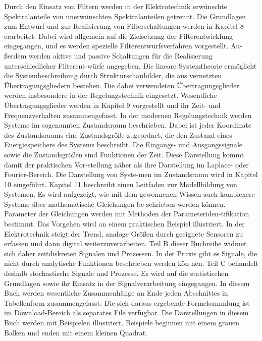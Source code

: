 Durch den Einsatz von Filtern werden in der Elektrotechnik erwünschte Spektralanteile von unerwünschten Spektralanteilen getrennt. Die Grundlagen zum Entwurf und zur Realisierung von Filterschaltungen werden in Kapitel 8 erarbeitet. Dabei wird allgemein auf die Zielsetzung der Filterentwicklung eingegangen, und es werden spezielle Filterentwurfsverfahren vorgestellt. Au-ßerdem werden aktive und passive Schaltungen für die Realisierung unterschiedlicher Filterent-würfe angegeben.\newline
Die lineare Systemtheorie ermöglicht die Systembeschreibung durch Strukturschaubilder, die aus vernetzten Übertragungsgliedern bestehen. Die dabei verwendeten Übertragungsglieder werden insbesondere in der Regelungstechnik eingesetzt. Wesentliche Übertragungsglieder werden in Kapitel 9 vorgestellt und ihr Zeit- und Frequenzverhalten zusammengefasst. \newline
In der modernen Regelungstechnik werden Systeme im sogenannten Zustandsraum beschrieben. Dabei ist jeder Koordinate des Zustandsraums eine Zustandsgröße zugeordnet, die den Zustand eines Energiespeichers des Systems beschreibt. Die Eingangs- und Ausgangssignale sowie die Zustandsgrößen sind Funktionen der Zeit. Diese Darstellung kommt damit der praktischen Vor-stellung näher als ihre Darstellung im Laplace- oder Fourier-Bereich. Die Darstellung von Syste-men im Zustandsraum wird in Kapitel 10 eingeführt.\newline
Kapitel 11 beschreibt einen Leitfaden zur Modellbildung von Systemen. Es wird aufgezeigt, wie mit dem gewonnenen Wissen auch komplexere Systeme über mathematische Gleichungen be-schrieben werden können. Parameter der Gleichungen werden mit Methoden der Parameteriden-tifikation bestimmt. Das Vorgehen wird an einem praktischen Beispiel illustriert.\newline
In der Elektrotechnik steigt der Trend, analoge Größen durch geeignete Sensoren zu erfassen und dann digital weiterzuverarbeiten. Teil B dieser Buchreihe widmet sich daher zeitdiskreten Signalen und Prozessen.\newline 
In der Praxis gibt es Signale, die nicht durch analytische Funktionen beschrieben werden kön-nen. Teil C behandelt deshalb stochastische Signale und Prozesse. Es wird auf die statistischen Grundlagen sowie ihr Einsatz in der Signalverarbeitung eingegangen. \newline
In diesem Buch werden wesentliche Zusammenhänge an Ende jeden Abschnittes in Tabellenform zusammengefasst. Die sich daraus ergebende Formelsammlung ist im Download-Bereich als separates File verfügbar.\newline
Die Darstellungen in diesem Buch werden mit Beispielen illustriert. Beispiele beginnen mit einem grauen Balken und enden mit einem kleinen Quadrat.\bigskip

